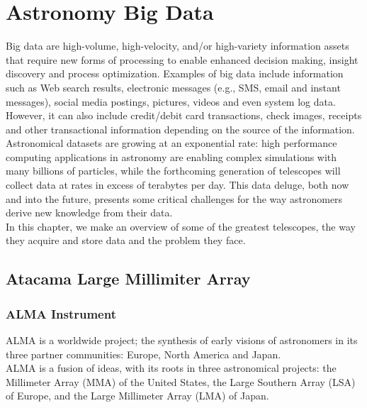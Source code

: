 \chapter{Astronomy Big Data}


Big data are high-volume, high-velocity, and/or high-variety information assets that require new forms of processing to enable enhanced decision making, insight discovery and process optimization. Examples of big data include information such as Web search results, electronic messages (e.g., SMS, email and instant messages), social media postings, pictures, videos and even system log data.  However, it can also include credit/debit card transactions, check images, receipts and other transactional information depending on the source of the information. \\

Astronomical datasets are growing at an exponential rate: high performance computing applications in astronomy are enabling complex simulations with many billions of particles, while the forthcoming generation of telescopes will collect data at rates in excess of terabytes per day. This data deluge, both now and into the future, presents some critical challenges for the way astronomers derive new knowledge from their data.\\



In this chapter, we make an overview of some of the greatest telescopes, the way they acquire and store data and the problem they face.


\section{Atacama Large Millimiter Array}

\subsection{ALMA Instrument}

ALMA is a worldwide project; the synthesis of early visions of astronomers in its three partner communities: Europe, North America and Japan.\\

ALMA is a fusion of ideas, with its roots in three astronomical projects: the Millimeter Array (MMA) of the United States, the Large Southern Array (LSA) of Europe, and the Large Millimeter Array (LMA) of Japan.\\


